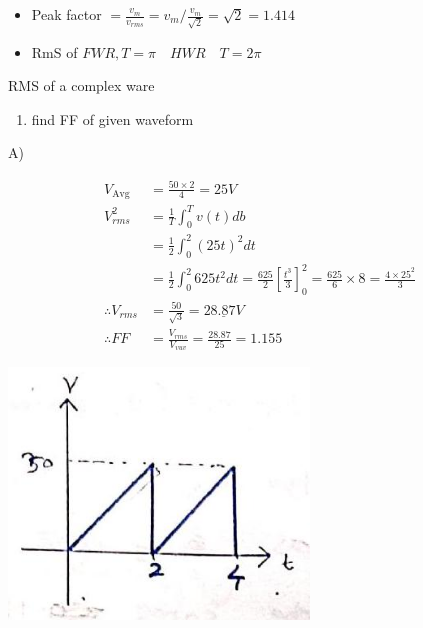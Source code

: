 \documentclass[12pt, a4paper]{article}
\newcommand{\figwidth}{8cm}
\begin{document}
	\begin{itemize}
		\item Peak factor $=\frac{v_{m}}{v_{r m s}}=v_{m} / \frac{v_{m}}{\sqrt{2}}=\sqrt{2}=1.414$

		\item RmS of $F W R, T=\pi \quad H W R \quad T=2 \pi$

	\end{itemize}

	RMS of a complex ware

	\begin{enumerate}
		\item find FF of given waveform
	\end{enumerate}

	A)

	$$
		\begin{aligned}
			V_{\text {Avg }}     & =\frac{50 \times 2}{4}=25 V                                                                                                                \\
			V_{r m s}^{2}        & =\frac{1}{T} \int_{0}^{T} v(t) d b                                                                                                         \\
			                     & =\frac{1}{2} \int_{0}^{2}(25 t)^{2} d t                                                                                                    \\
			                     & =\frac{1}{2} \int_{0}^{2} 625 t^{2} d t=\frac{625}{2}\left[\frac{t^{3}}{3}\right]_{0}^{2}=\frac{625}{6} \times 8=\frac{4 \times 25^{2}}{3} \\
			\therefore V_{r m s} & =\frac{50}{\sqrt{3}}=\underline{28.87 V}                                                                                                   \\
			\therefore F F       & =\frac{V_{r m s}}{V_{v u v}}=\frac{28.87}{25}=1.155
		\end{aligned}
	$$

	\begin{center}
		\includegraphics[max width=\figwidth]{2024_06_15_74bbabba7981675b0d49g-02(1)}
	\end{center}
\end{document}
